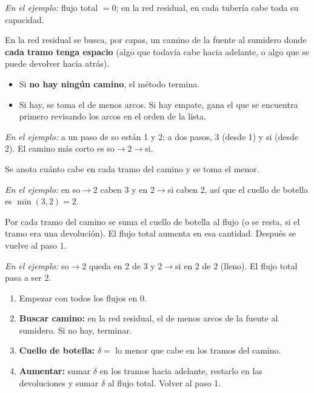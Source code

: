 \documentclass[11pt,a4paper]{article}
\begin{document}
\textit{En el ejemplo:} flujo total $= 0$; en la red residual, en cada tubería cabe toda su capacidad.

En la red residual se busca, por capas, un camino de la fuente al sumidero donde \textbf{cada tramo tenga espacio}
(algo que todavía cabe hacia adelante, o algo que se puede devolver hacia atrás).
\begin{itemize}[itemsep=2pt]
  \item Si \textbf{no hay ningún camino}, el método termina.
  \item Si hay, se toma el de menos arcos. Si hay empate, gana el que se encuentra primero revisando los arcos en
        el orden de la lista.
\end{itemize}
\textit{En el ejemplo:} a un paso de so están 1 y 2; a dos pasos, 3 (desde 1) y si (desde 2). El camino más corto
es so$\to$2$\to$si.

Se anota cuánto cabe en cada tramo del camino y se toma el menor.

\textit{En el ejemplo:} en so$\to$2 caben 3 y en 2$\to$si caben 2, así que el cuello de botella es
$\min(3, 2) = 2$.

Por cada tramo del camino se suma el cuello de botella al flujo (o se resta, si el tramo era una devolución).
El flujo total aumenta en esa cantidad. Después se vuelve al paso 1.

\textit{En el ejemplo:} so$\to$2 queda en 2 de 3 y 2$\to$si en 2 de 2 (lleno). El flujo total pasa a ser 2.

\begin{idea}
\begin{enumerate}[leftmargin=*, itemsep=3pt]
  \item[\textbf{0.}] Empezar con todos los flujos en 0.
  \item \textbf{Buscar camino:} en la red residual, el de menos arcos de la fuente al sumidero.
        Si no hay, terminar.
  \item \textbf{Cuello de botella:} $\delta = $ lo menor que cabe en los tramos del camino.
  \item \textbf{Aumentar:} sumar $\delta$ en los tramos hacia adelante, restarlo en las devoluciones y
        sumar $\delta$ al flujo total. Volver al paso 1.
\end{enumerate}
\end{idea}
\end{document}
